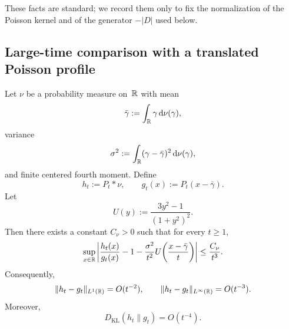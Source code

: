 \begin{remark}
These facts are standard; we record them only to fix the normalization
of the Poisson kernel and of the generator $-|D|$ used below.
\end{remark}

\subsection{Large-time comparison with a translated Poisson profile}

\begin{proposition}%
\label{thm:poisson-second-order}
Let $\nu$ be a probability measure on~$\mathbb{R}$ with mean
\[
\bar\gamma:=\int_{\mathbb{R}}\gamma\,\mathrm{d}\nu(\gamma),
\]
variance
\[
\sigma^{2}:=\int_{\mathbb{R}}(\gamma-\bar\gamma)^{2}\,\mathrm{d}\nu(\gamma),
\]
and finite centered fourth moment.  Define
\[
h_t:=P_t*\nu,
\qquad
g_t(x):=P_t(x-\bar\gamma).
\]
Let
\[
U(y):=\frac{3y^{2}-1}{(1+y^{2})^{2}}.
\]
Then there exists a constant $C_\nu>0$ such that for every $t\ge 1$,
\begin{equation}\label{eq:poisson-profile}
\sup_{x\in\mathbb{R}}\left|
\frac{h_t(x)}{g_t(x)}
-1
-\frac{\sigma^{2}}{t^{2}}U\!\left(\frac{x-\bar\gamma}{t}\right)
\right|
\le \frac{C_\nu}{t^{3}}.
\end{equation}
Consequently,
\begin{equation}\label{eq:poisson-l1-rate}
\|h_t-g_t\|_{L^{1}(\mathbb{R})}=O(t^{-2}),
\qquad
\|h_t-g_t\|_{L^\infty(\mathbb{R})}=O(t^{-3}).
\end{equation}
Moreover,
\begin{equation}\label{eq:poisson-kl-rate}
D_{\mathrm{KL}}(h_t\|g_t)=O(t^{-4}).
\end{equation}
\end{proposition}

